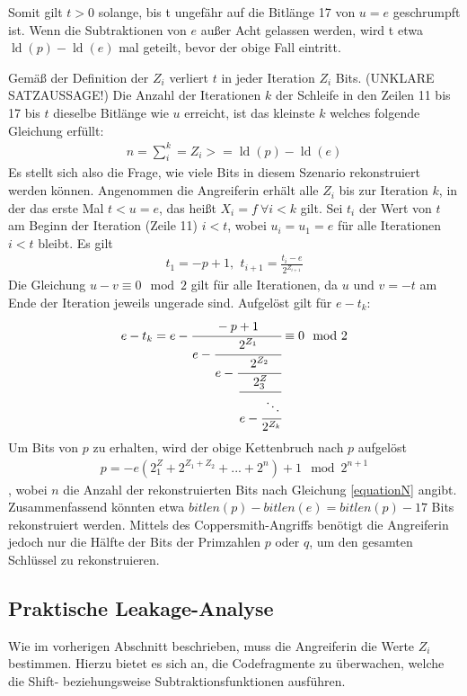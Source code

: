 Somit gilt $t>0$ solange, bis t ungefähr auf die Bitlänge 17 von $u=e$ geschrumpft ist.
Wenn die Subtraktionen von $e$ außer Acht gelassen werden, wird t etwa $\operatorname{ld}(p) - \operatorname{ld}(e)$ mal geteilt, bevor der obige Fall eintritt.

Gemäß der Definition der $Z_i$ verliert $t$ in jeder Iteration $Z_i$ Bits. 
(UNKLARE SATZAUSSAGE!) Die Anzahl der Iterationen $k$ der Schleife in den Zeilen 11 bis 17 bis $t$ dieselbe Bitlänge wie $u$ erreicht, ist das kleinste $k$ welches folgende Gleichung erfüllt: 
\begin{align}
\label{equationN}
n = \sum\limits_i^k = Z_i >= \operatorname{ld}(p) - \operatorname{ld}(e)
\end{align}
Es stellt sich also die Frage, wie viele Bits in diesem Szenario rekonstruiert werden können.
Angenommen die Angreiferin erhält alle $Z_i$ bis zur Iteration $k$, in der das erste Mal $t<u=e$, das heißt $X_i=f \: \forall i < k$ gilt.
Sei $t_i$ der Wert von $t$ am Beginn der Iteration (Zeile 11) $i<t$, wobei $u_i=u_1=e$ für alle Iterationen $i<t$ bleibt.
Es gilt 
\begin{align}
t_1=-p+1 \text{, } \: t_{i+1} = \frac{t_i - e}{2^{Z_{i+1}}}
\end{align}
Die Gleichung $u-v \equiv 0 \mod 2$ gilt für alle Iterationen, da $u$ und $v=-t$ am Ende der Iteration jeweils ungerade sind.
Aufgelöst gilt für $e-t_k$:
\begin{align}
e-t_k = e- \cfrac{-p+1}{e - \cfrac{2^{Z_1}}{e- \cfrac{2^{Z_2}}{
          \cfrac{2^Z_3}{e - \cfrac{\ddots}{2^{Z_k}}}}}} \equiv 0 \mod 2
\end{align}
Um Bits von $p$ zu erhalten, wird der obige Kettenbruch nach $p$ aufgelöst
\begin{align}
p = -e(2^Z_1+2^{Z_1+Z_2}+...+2^n)+1 \mod 2^{n+1}
\end{align}
, wobei $n$ die Anzahl der rekonstruierten Bits nach Gleichung \ref{equationN} angibt.
Zusammenfassend könnten etwa $bitlen(p)-bitlen(e)=bitlen(p)-17$ Bits rekonstruiert werden.
Mittels des Coppersmith-Angriffs \cite{CoppersmithBound} benötigt die Angreiferin jedoch nur die Hälfte der Bits der Primzahlen $p$ oder $q$, um den gesamten Schlüssel zu rekonstruieren.

\subsection{Praktische Leakage-Analyse}
\label{PracticalLeakageAnalysis}

Wie im vorherigen Abschnitt beschrieben, muss die Angreiferin die Werte $Z_i$ bestimmen.
Hierzu bietet es sich an, die Codefragmente zu überwachen, welche die Shift- beziehungsweise Subtraktionsfunktionen ausführen.

